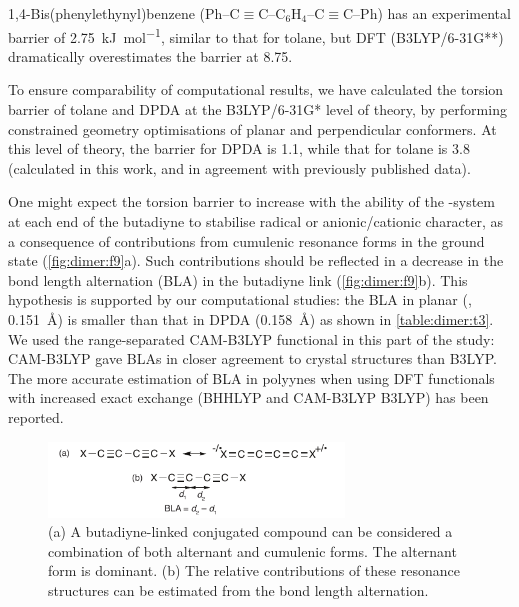 		1,4-Bis(phenylethynyl)benzene (Ph–C$\equiv$C–C$_6$H$_4$–C$\equiv$C–Ph) has an experimental barrier of \SI{2.75}{\kilo\joule\per\mole}, similar to that for tolane, but DFT (B3LYP/6-31G**) dramatically overestimates the barrier at \SI{8.75}{\kjmol}.\autocite{Greaves2006}

		To ensure comparability of computational results, we have calculated the torsion barrier of tolane and DPDA at the B3LYP/6-31G* level of theory, by performing constrained geometry optimisations of planar and perpendicular conformers. At this level of theory, the barrier for DPDA is \SI{1.1}{\kjmol}, while that for tolane is \SI{3.8}{\kjmol} (calculated in this work, and in agreement with previously published data\autocite{Wierzbicka2015}).

		One might expect the torsion barrier to increase with the ability of the \pii-system at each end of the butadiyne to stabilise radical or anionic/cationic character, as a consequence of contributions from cumulenic resonance forms in the ground state (\autoref{fig:dimer:f9}a). Such contributions should be reflected in a decrease in the bond length alternation (BLA) in the butadiyne link (\autoref{fig:dimer:f9}b). This hypothesis is supported by our computational studies: the BLA in planar  (, \SI{0.151}{\angstrom}) is smaller than that in DPDA (\SI{0.158}{\angstrom}) as shown in \autoref{table:dimer:t3}. We used the range-separated CAM-B3LYP\autocite{Yanai2004} functional in this part of the study: CAM-B3LYP gave BLAs in closer agreement to crystal structures than B3LYP\@. The more accurate estimation of BLA in polyynes when using DFT functionals with increased exact exchange (BHHLYP and CAM-B3LYP  B3LYP) has been reported.\autocite{Peach2007}

		\begin{figure}[ht!]
			\centering\includegraphics[width=0.7\textwidth]{figures/dimer/Figure-9.pdf} 
			\caption[]{(a) A butadiyne-linked conjugated compound can be considered a combination of both alternant and cumulenic forms. The alternant form is dominant. (b) The relative contributions of these resonance structures can be estimated from the bond length alternation.}
			\label{fig:dimer:f9}
		\end{figure}

